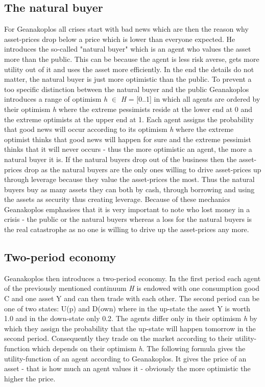 \documentclass[../Bachelorarbeit.tex]{subfiles}
\begin{document}
\subsection{The natural buyer}
For Geanakoplos all crises start with bad news which are then the reason why asset-prices drop below a price which is lower than everyone expected. He introduces the so-called "natural buyer" which is an agent who values the asset more than the public. This can be because the agent is less risk averse, gets more utility out of it and uses the asset more efficiently. In the end the details do not matter, the natural buyer is just more optimistic than the public.
To prevent a too specific distinction between the natural buyer and the public Geanakoplos introduces a range of optimism \textit{h} $\in$ \textit{H} = [0..1] in which all agents are ordered by their optimism \textit{h} where the extreme pessimists reside at the lower end at 0 and the extreme optimists at the upper end at 1. Each agent assigns the probability that good news will occur according to its optimism \textit{h} where the extreme optimist thinks that good news will happen for sure and the extreme pessimist thinks that it will never occurs - thus the more optimistic an agent, the more a natural buyer it is. If the natural buyers drop out of the business then the asset-prices drop as the natural buyers are the only ones willing to drive asset-prices up through leverage because they value the asset-prices the most. Thus the natural buyers buy as many assets they can both by cash, through borrowing and using the assets as security thus creating leverage. Because of these mechanics Geanakoplos emphasises that it is very important to note who lost money in a crisis - the public or the natural buyers whereas a loss for the natural buyers is the real catastrophe as no one is willing to drive up the asset-prices any more.

\subsection{Two-period economy}
Geanakoplos then introduces a two-period economy. In the first period each agent of the previously mentioned continuum \textit{H} is endowed with one consumption good C and one asset Y and can then trade with each other. The second period can be one of two states: U(p) and D(own) where in the up-state the asset Y is worth 1.0 and in the down-state only 0.2. The agents differ only in their optimism \textit{h} by which they assign the probability that the up-state will happen tomorrow in the second period. Consequently they trade on the market according to their utility-function which depends on their optimism \textit{h}. The following formula gives the utility-function of an agent according to Geanakoplos. It gives the price of an asset - that is how much an agent values it - obviously the more optimistic the higher the price.
\end{document}
